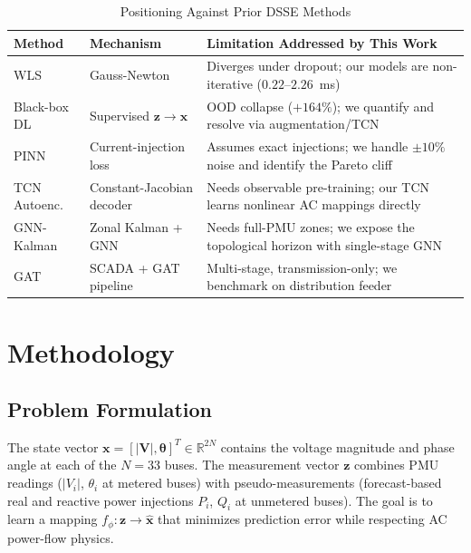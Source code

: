 \documentclass[conference]{IEEEtran}
\begin{document}
\begin{table}[t]
\centering
\caption{Positioning Against Prior DSSE Methods}
\label{tab:literature}
\footnotesize
\setlength{\tabcolsep}{3pt}
\begin{tabular}{p{1.8cm}p{2.2cm}p{3.5cm}}
\toprule
\textbf{Method} & \textbf{Mechanism} & \textbf{Limitation Addressed by This Work} \\
\midrule
WLS \cite{schweppe1970} & Gauss-Newton & Diverges under dropout; our models are non-iterative ($0.22$--$2.26$~ms) \\
\addlinespace
Black-box DL & Supervised $\mathbf{z}{\to}\mathbf{x}$ & OOD collapse ($+164\%$); we quantify and resolve via augmentation/TCN \\
\addlinespace
PINN \cite{iliadis2025} & Current-injection loss & Assumes exact injections; we handle ${\pm}10\%$ noise and identify the Pareto cliff \\
\addlinespace
TCN Autoenc. \cite{raghuvamsi2024} & Constant-Jacobian decoder & Needs observable pre-training; our TCN learns nonlinear AC mappings directly \\
\addlinespace
GNN-Kalman \cite{ngo2024} & Zonal Kalman + GNN & Needs full-PMU zones; we expose the topological horizon with single-stage GNN \\
\addlinespace
GAT \cite{hu2025} & SCADA + GAT pipeline & Multi-stage, transmission-only; we benchmark on distribution feeder \\
\bottomrule
\end{tabular}
\end{table}

\section{Methodology}

\subsection{Problem Formulation}

The state vector $\mathbf{x} = [|\mathbf{V}|, \boldsymbol{\theta}]^T \in \mathbb{R}^{2N}$ contains the voltage magnitude and phase angle at each of the $N = 33$ buses. The measurement vector $\mathbf{z}$ combines PMU readings ($|V_i|$, $\theta_i$ at metered buses) with pseudo-measurements (forecast-based real and reactive power injections $P_i$, $Q_i$ at unmetered buses). The goal is to learn a mapping $f_\phi: \mathbf{z} \to \hat{\mathbf{x}}$ that minimizes prediction error while respecting AC power-flow physics.
\end{document}
